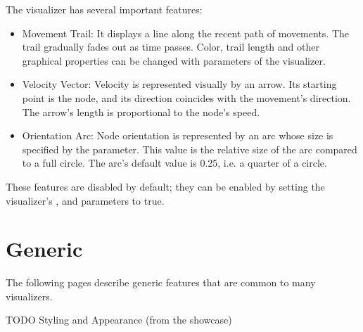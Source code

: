 The visualizer has several important features:

\begin{itemize}
  \item Movement Trail: It displays a line along the recent path of movements.
        The trail gradually fades out as time passes. Color, trail length and
        other graphical properties can be changed with parameters of the
        visualizer.
  \item Velocity Vector: Velocity is represented visually by an arrow. Its
        starting point is the node, and its direction coincides with the
        movement's direction. The arrow's length is proportional to the node's
       speed.
  \item Orientation Arc: Node orientation is represented by an arc whose size
       is specified by the  parameter. This value is the
       relative size of the arc compared to a full circle. The arc's default
       value is 0.25, i.e. a quarter of a circle.
\end{itemize}

These features are disabled by default; they can be enabled by setting the
visualizer's ,  and
 parameters to true.


\section{Generic}

The following pages describe generic features that are common to many visualizers.

TODO Styling and Appearance (from the showcase)



